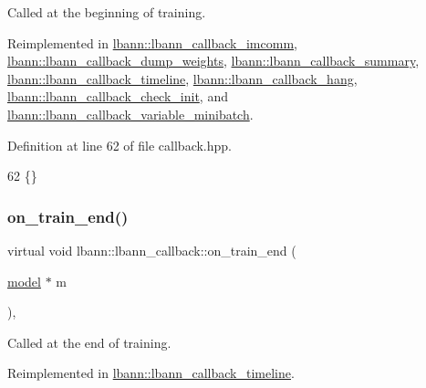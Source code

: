 Called at the beginning of training. 

Reimplemented in \hyperlink{classlbann_1_1lbann__callback__imcomm_a332ba4ceca91939c79fae2735fdc8ff3}{lbann\+::lbann\+\_\+callback\+\_\+imcomm}, \hyperlink{classlbann_1_1lbann__callback__dump__weights_a46db01d535414a0965caae709a08a150}{lbann\+::lbann\+\_\+callback\+\_\+dump\+\_\+weights}, \hyperlink{classlbann_1_1lbann__callback__summary_a1ff0c4368aee47c294b9c11a5176b9e0}{lbann\+::lbann\+\_\+callback\+\_\+summary}, \hyperlink{classlbann_1_1lbann__callback__timeline_a35a431c2545b4087d6f970d45f86c054}{lbann\+::lbann\+\_\+callback\+\_\+timeline}, \hyperlink{classlbann_1_1lbann__callback__hang_ada39fd10375143a26c99e0a32d4368ce}{lbann\+::lbann\+\_\+callback\+\_\+hang}, \hyperlink{classlbann_1_1lbann__callback__check__init_a037f1371c56c1b528f487517a58ce3fb}{lbann\+::lbann\+\_\+callback\+\_\+check\+\_\+init}, and \hyperlink{classlbann_1_1lbann__callback__variable__minibatch_a4f5d8ab04ab3e1cc3aa66327d3712f51}{lbann\+::lbann\+\_\+callback\+\_\+variable\+\_\+minibatch}.



Definition at line 62 of file callback.\+hpp.


\begin{DoxyCode}
62 \{\}
\end{DoxyCode}
\mbox{\label{classlbann_1_1lbann__callback_af28078b0ddaef45124465bef01eefedf}} 
\subsubsection{\texorpdfstring{on\+\_\+train\+\_\+end()}{on\_train\_end()}}
{\footnotesize\ttfamily virtual void lbann\+::lbann\+\_\+callback\+::on\+\_\+train\+\_\+end (\begin{DoxyParamCaption}\item[{\hyperlink{classlbann_1_1model}{model} $\ast$}]{m }\end{DoxyParamCaption})\hspace{0.3cm}{\ttfamily [inline]}, {\ttfamily [virtual]}}

Called at the end of training. 

Reimplemented in \hyperlink{classlbann_1_1lbann__callback__timeline_a7af247d7f016db358da0a57f8a4b76c6}{lbann\+::lbann\+\_\+callback\+\_\+timeline}.




